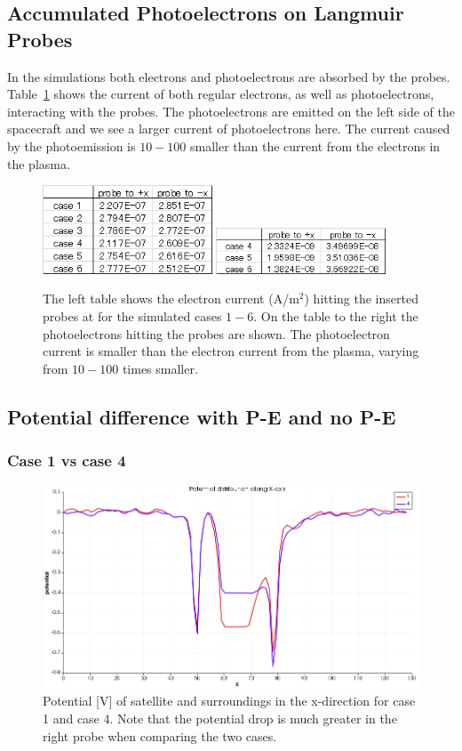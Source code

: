 \subsection{Accumulated Photoelectrons on Langmuir Probes}
\label{sec:acc_emitted}

In the simulations both electrons and photoelectrons are absorbed by the probes. Table~\ref{tab:elec_current} shows the current
of both regular electrons, as well as photoelectrons, interacting with the probes.
The photoelectrons are emitted on the left side of the spacecraft and we see a larger current of
photoelectrons here. The current caused by the photoemission is \(10-100\) smaller than the current
from the electrons in the plasma.

\begin{figure}[h]
	\includegraphics[width = 0.45\textwidth]{images/caliculation_of_electron_current}
	\includegraphics[width = 0.45\textwidth]{images/caliculation_of_PE_current}
	\caption{The left table shows the electron current (A/m\(^2\)) hitting the inserted probes at
	for the simulated cases \(1-6\). On the table to the right the photoelectrons hitting the probes are shown.
	The photoelectron current is smaller than the electron current from the plasma, varying from \(10-100\) times smaller.}
	\label{tab:elec_current}
\end{figure}

\subsection{Potential difference with P-E and no P-E}

\subsubsection{Case 1 vs case 4}

\begin{figure}
    \centering
    \includegraphics[width = 0.6 \textwidth]{images/pot_case14.png}
    \caption{Potential [V] of satellite and surroundings in the x-direction for case 1 and case 4. Note that the potential drop is much greater in the right probe when comparing the two cases.}
    \label{fig:pot_case14}
\end{figure}


